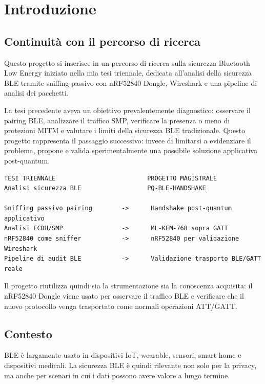 \documentclass[11pt,a4paper]{article}
\begin{document}
\clearpage
\tableofcontents
\clearpage
{}

\section{Introduzione}\label{capitolo-1---introduzione}

\subsection{Continuità con il percorso di
ricerca}\label{continuituxe0-con-il-percorso-di-ricerca}

Questo progetto si inserisce in un percorso di ricerca sulla sicurezza
Bluetooth Low Energy iniziato nella mia tesi triennale, dedicata
all'analisi della sicurezza BLE tramite sniffing passivo con nRF52840
Dongle, Wireshark e una pipeline di analisi dei pacchetti.

La tesi precedente aveva un obiettivo prevalentemente diagnostico:
osservare il pairing BLE, analizzare il traffico SMP, verificare la
presenza o meno di protezioni MITM e valutare i limiti della sicurezza
BLE tradizionale. Questo progetto rappresenta il passaggio successivo:
invece di limitarsi a evidenziare il problema, propone e valida
sperimentalmente una possibile soluzione applicativa post-quantum.

\begin{lstlisting}
TESI TRIENNALE                         PROGETTO MAGISTRALE
Analisi sicurezza BLE                  PQ-BLE-HANDSHAKE

Sniffing passivo pairing        ->      Handshake post-quantum applicativo
Analisi ECDH/SMP                ->      ML-KEM-768 sopra GATT
nRF52840 come sniffer           ->      nRF52840 per validazione Wireshark
Pipeline di audit BLE           ->      Validazione trasporto BLE/GATT reale
\end{lstlisting}

Il progetto riutilizza quindi sia la strumentazione sia la conoscenza
acquisita: il nRF52840 Dongle viene usato per osservare il traffico BLE
e verificare che il nuovo protocollo venga trasportato come normali
operazioni ATT/GATT.

\subsection{Contesto}\label{contesto}

BLE è largamente usato in dispositivi IoT, wearable, sensori, smart home
e dispositivi medicali. La sicurezza BLE è quindi rilevante non solo per
la privacy, ma anche per scenari in cui i dati possono avere valore a
lungo termine.
\end{document}
